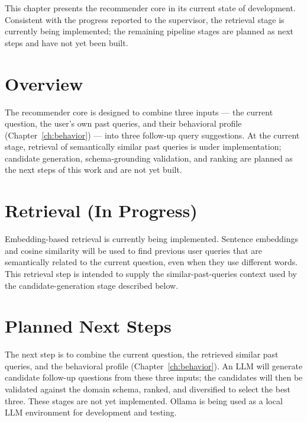 This chapter presents the recommender core in its current state of development. Consistent with
the progress reported to the supervisor, the retrieval stage is currently being implemented; the
remaining pipeline stages are planned as next steps and have not yet been built.

\section{Overview}
\label{sec:rec-overview}

The recommender core is designed to combine three inputs --- the current question, the user's own
past queries, and their behavioral profile (Chapter~\ref{ch:behavior}) --- into three follow-up
query suggestions. At the current stage, retrieval of semantically similar past queries is under
implementation; candidate generation, schema-grounding validation, and ranking are planned as the
next steps of this work and are not yet built.

\section{Retrieval (In Progress)}
\label{sec:rec-retrieval}

Embedding-based retrieval is currently being implemented. Sentence embeddings and cosine
similarity will be used to find previous user queries that are semantically related to the
current question, even when they use different words. This retrieval step is intended to supply
the similar-past-queries context used by the candidate-generation stage described below.

\section{Planned Next Steps}
\label{sec:rec-generation}
\label{sec:rec-validation}
\label{sec:rec-ranking}

The next step is to combine the current question, the retrieved similar past queries, and the
behavioral profile (Chapter~\ref{ch:behavior}). An LLM will generate candidate follow-up
questions from these three inputs; the candidates will then be validated against the domain
schema, ranked, and diversified to select the best three. These stages are not yet implemented.
Ollama is being used as a local LLM environment for development and testing.
